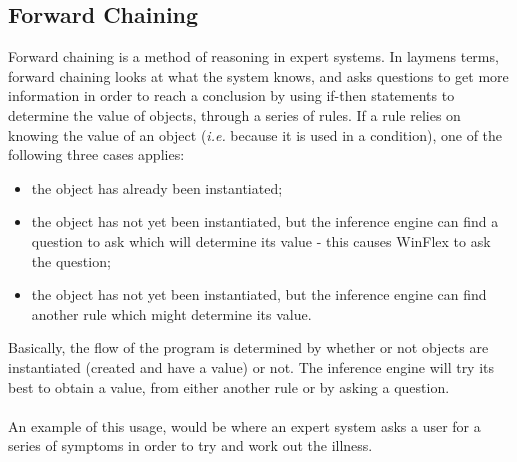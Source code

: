 \documentclass[12pt]{report}
\begin{document}
\subsection{Forward Chaining}\label{subsec:forward_chaining}
Forward chaining is a method of reasoning in expert systems.  In laymens terms, forward chaining looks at what the system knows, and asks questions to get more information in order to reach a conclusion by using if-then statements to determine the value of objects, through a series of rules.
\clearpage
If a rule relies on knowing the value of an object (\textit{i.e.} because it is used in a condition), one of the following three cases applies:
\begin{itemize}
	\item the object has already been instantiated;
	\item the object has not yet been instantiated, but the inference engine can find a question to ask which will determine its value - this causes WinFlex to ask the question;
	\item the object has not yet been instantiated, but the inference engine can find another rule which might determine its value. \citep{forwardchaning09}
\end{itemize}
Basically, the flow of the program is determined by whether or not objects are instantiated (created and have a value) or not.  The inference engine will try its best to obtain a value, from either another rule or by asking a question.\\
\\
An example of this usage, would be where an expert system asks a user for a series of symptoms in order to try and work out the illness.
\end{document}
